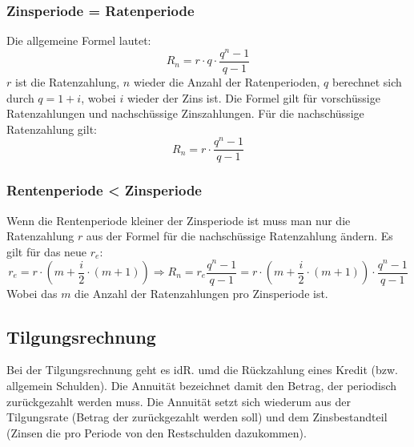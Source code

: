 \documentclass[a4paper]{scrartcl}
\begin{document}
            \subsubsection{Zinsperiode = Ratenperiode}
                Die allgemeine Formel lautet: 
                \begin{equation*}
                    R_n = r \cdot q \cdot \frac{q^n - 1}{q-1}
                \end{equation*}
                \(r\) ist die Ratenzahlung, \(n\) wieder die Anzahl der Ratenperioden, \(q\) berechnet sich durch \(q = 1 +i\), wobei \(i\) wieder der Zins ist. Die Formel gilt für vorschüssige Ratenzahlungen und nachschüssige Zinszahlungen.
                Für die nachschüssige Ratenzahlung gilt: 
                \begin{equation*}
                    R_n = r \cdot \frac{q^n - 1}{q - 1}
                \end{equation*}
            \subsubsection{Rentenperiode < Zinsperiode}
                Wenn die Rentenperiode kleiner der Zinsperiode ist muss man nur die Ratenzahlung \(r\) aus der Formel für die nachschüssige Ratenzahlung ändern. Es gilt für das neue \(r_e\):
                \begin{equation*}
                    r_e = r \cdot (m + \frac{i}{2} \cdot (m + 1)) \Rightarrow R_n = r_e \frac{q^n-1}{q-1} = r \cdot (m + \frac{i}{2} \cdot (m + 1)) \cdot \frac{q^n-1}{q-1}
                \end{equation*}
                Wobei das \(m\) die Anzahl der Ratenzahlungen pro Zinsperiode ist.
        
        \subsection{Tilgungsrechnung}
        Bei der Tilgungsrechnung geht es idR. umd die Rückzahlung eines Kredit (bzw. allgemein Schulden). Die Annuität bezeichnet damit den Betrag, der periodisch zurückgezahlt werden muss.
        Die Annuität setzt sich wiederum aus der Tilgungsrate (Betrag der zurückgezahlt werden soll) und dem Zinsbestandteil (Zinsen die pro Periode von den Restschulden dazukommen).
\end{document}
